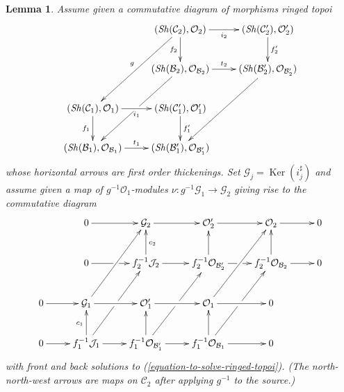 \documentclass{stacks-project}
\theoremstyle{plain}
\newtheorem{lemma}[subsection]{Lemma}
\theoremstyle{definition}
\theoremstyle{remark}
\numberwithin{equation}{subsection}
\def\Ext{\mathop{\mathrm{Ext}}\nolimits}
\def\Sh{\mathop{\mathit{Sh}}\nolimits}
\def\NL{\mathop{N\!L}\nolimits}
\def\Ker{\mathop{\mathrm{Ker}}}
\begin{document}
\begin{lemma}
\label{lemma-huge-diagram-ringed-topoi}
Assume given a commutative diagram of morphisms ringed topoi
\begin{equation}
\label{equation-huge-1-ringed-topoi}
\vcenter{
\xymatrix{
& (\Sh(\mathcal{C}_2), \mathcal{O}_2) \ar[r]_{i_2} \ar[d]_{f_2} \ar[ddl]_g &
(\Sh(\mathcal{C}'_2), \mathcal{O}'_2) \ar[d]^{f'_2} \\
&
(\Sh(\mathcal{B}_2), \mathcal{O}_{\mathcal{B}_2}) \ar[r]^{t_2} \ar[ddl]|\hole &
(\Sh(\mathcal{B}'_2), \mathcal{O}_{\mathcal{B}'_2}) \ar[ddl] \\
(\Sh(\mathcal{C}_1), \mathcal{O}_1) \ar[r]_{i_1} \ar[d]_{f_1} &
(\Sh(\mathcal{C}'_1), \mathcal{O}'_1) \ar[d]^{f'_1} \\
(\Sh(\mathcal{B}_1), \mathcal{O}_{\mathcal{B}_1}) \ar[r]^{t_1} &
(\Sh(\mathcal{B}'_1), \mathcal{O}_{\mathcal{B}'_1})
}
}
\end{equation}
whose horizontal arrows are first order thickenings. Set
$\mathcal{G}_j = \Ker(i_j^\sharp)$ and assume given a
map of $g^{-1}\mathcal{O}_1$-modules
$\nu : g^{-1}\mathcal{G}_1 \to \mathcal{G}_2$
giving rise to the commutative diagram
\begin{equation}
\label{equation-huge-2-ringed-topoi}
\vcenter{
\xymatrix{
& 0 \ar[r] & \mathcal{G}_2 \ar[r] &
\mathcal{O}'_2 \ar[r] &
\mathcal{O}_2 \ar[r] & 0 \\
& 0 \ar[r]|\hole &
f_2^{-1}\mathcal{J}_2 \ar[u]_{c_2} \ar[r] &
f_2^{-1}\mathcal{O}_{\mathcal{B}'_2} \ar[u] \ar[r]|\hole &
f_2^{-1}\mathcal{O}_{\mathcal{B}_2} \ar[u] \ar[r] & 0 \\
0 \ar[r] &
\mathcal{G}_1 \ar[ruu] \ar[r] &
\mathcal{O}'_1 \ar[r] &
\mathcal{O}_1 \ar[ruu] \ar[r] & 0 \\
0 \ar[r] &
f_1^{-1}\mathcal{J}_1 \ar[ruu]|\hole \ar[u]^{c_1} \ar[r] &
f_1^{-1}\mathcal{O}_{\mathcal{B}'_1} \ar[ruu]|\hole \ar[u] \ar[r] &
f_1^{-1}\mathcal{O}_{\mathcal{B}_1} \ar[ruu]|\hole \ar[u] \ar[r] & 0
}
}
\end{equation}
with front and back solutions to (\ref{equation-to-solve-ringed-topoi}).
(The north-north-west arrows are maps on $\mathcal{C}_2$ after applying
$g^{-1}$ to the source.)
\end{lemma}
\end{document}
